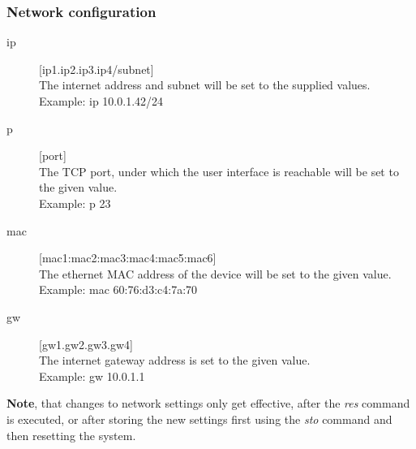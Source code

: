 \documentclass[a4paper]{scrreprt}
\begin{document}
\subsubsection{Network configuration}
\begin{description}
  \item[ip] [ip1.ip2.ip3.ip4/subnet]\\
    The internet address and subnet will be set to the supplied
    values.\\
    Example: ip 10.0.1.42/24
  \item[p] [port]\\
    The TCP port, under which the user interface is reachable will be
    set to the given value.\\
    Example: p 23
  \item[mac] [mac1:mac2:mac3:mac4:mac5:mac6]\\
    The ethernet MAC address of the device will be set to the given value.\\
    Example: mac 60:76:d3:c4:7a:70
  \item[gw] [gw1.gw2.gw3.gw4]\\
    The internet gateway address is set to the given value.\\
    Example: gw 10.0.1.1
\end{description}
    \textbf{Note}, that changes to network settings only get effective, after the \emph{res} command is executed, or after storing the new settings first using the \emph{sto} command and then resetting the system.
\end{document}
